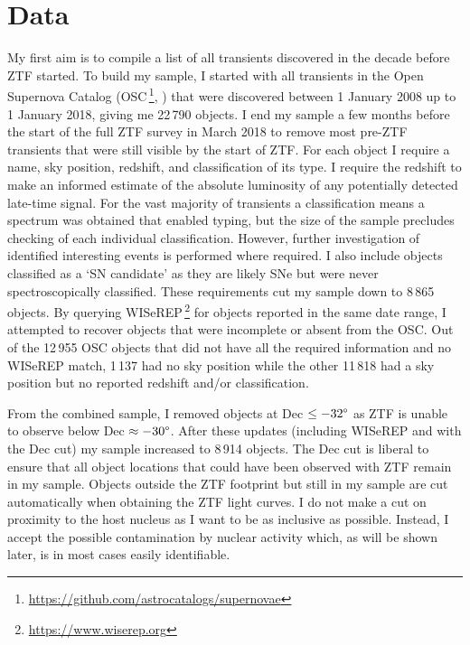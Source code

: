 \documentclass[a4paper,oneside,12pt, class=Latex/Classes/PhDthesisPSnPDF, crop=false]{standalone}
\begin{document}
\section{Data}
\label{Pre-ZTF_data}
My first aim is to compile a list of all transients discovered in the decade before ZTF started. To build my sample, I started with all transients in the Open Supernova Catalog (OSC\,\footnote{\url{https://github.com/astrocatalogs/supernovae}}, \citealt{Open_SN_cat}) that were discovered between 1 January 2008 up to 1 January 2018, giving me 22\,790 objects. I end my sample a few months before the start of the full ZTF survey in March 2018 to remove most pre-ZTF transients that were still visible by the start of ZTF. For each object I require a name, sky position, redshift, and classification of its type. I require the redshift to make an informed estimate of the absolute luminosity of any potentially detected late-time signal. For the vast majority of transients a classification means a spectrum was obtained that enabled typing, but the size of the sample precludes checking of each individual classification. However, further investigation of identified interesting events is performed where required. I also include objects classified as a `SN candidate' as they are likely SNe but were never spectroscopically classified. These requirements cut my sample down to 8\,865 objects. By querying WISeREP\,\footnote{\url{https://www.wiserep.org}} \citep{wiserep} for objects reported in the same date range, I attempted to recover objects that were incomplete or absent from the OSC. Out of the 12\,955 OSC objects that did not have all the required information and no WISeREP match, 1\,137 had no sky position while the other 11\,818 had a sky position but no reported redshift and/or classification.

From the combined sample, I removed objects at Dec $\leq -32\degree$ as ZTF is unable to observe below Dec $\approx -30\degree$. After these updates (including WISeREP and with the Dec cut) my sample increased to 8\,914 objects. The Dec cut is liberal to ensure that all object locations that could have been observed with ZTF remain in my sample. Objects outside the ZTF footprint but still in my sample are cut automatically when obtaining the ZTF light curves. I do not make a cut on proximity to the host nucleus as I want to be as inclusive as possible. Instead, I accept the possible contamination by nuclear activity which, as will be shown later, is in most cases easily identifiable.
\end{document}

